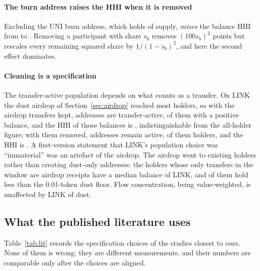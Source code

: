 \paragraph{The burn address raises the HHI when it is removed}
Excluding the UNI burn address, which holds  of supply,
\emph{raises} the balance HHI from  to .
Removing a participant with share $s_b$ removes $(100 s_b)^2$ points but
rescales every remaining squared share by $1/(1-s_b)^2$, and here the second
effect dominates.

\paragraph{Cleaning is a specification}
The transfer-active population depends on what counts as a transfer. On LINK
the dust airdrop of Section~\ref{sec:airdrop} reached most holders, so with
the airdrop transfers kept,  addresses are
transfer-active,  of them with a positive balance, and
the HHI of those balances is , indistinguishable from
the all-holder figure; with them removed,  addresses remain
active,  of them holders, and the HHI is
. A
first-version statement that LINK's population choice was ``immaterial''
was an artefact of the airdrop. The airdrop went to existing holders rather
than creating dust-only addresses: the  holders whose
only transfers in the window are airdrop receipts have a median balance of
 LINK, and  of them hold
less than the 0.01-token dust floor. Flow concentration, being value-weighted, is
unaffected by  LINK of dust.

\subsection{What the published literature uses}
\label{sec:lit}
Table~\ref{tab:lit} records the specification choices of the studies closest
to ours. None of them is wrong; they are different measurements, and their
numbers are comparable only after the choices are aligned.

